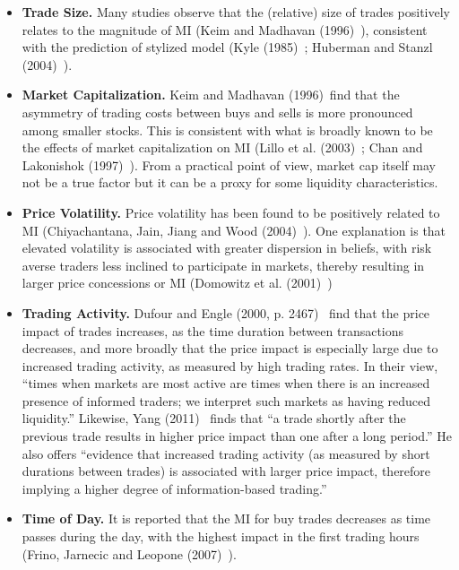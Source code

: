 \begin{itemize}
\item \textbf{Trade Size.} Many studies observe that the (relative) size of trades positively relates to the magnitude of MI (Keim and Madhavan (1996)~\cite{madhavan}), consistent with the prediction of stylized model (Kyle (1985)~\cite{kyle1985}; Huberman and Stanzl (2004)~\cite{huberstan}).

\item \textbf{Market Capitalization.} Keim and Madhavan (1996)~\cite{keim1996}find that the asymmetry of trading costs between buys and sells is more pronounced among smaller stocks. This is consistent with what is broadly known to be the effects of market capitalization on MI (Lillo et al. (2003)~\cite{farmermantegna}; Chan and Lakonishok (1997)~\cite{chan1997}). From a practical point of view, market cap itself may not be a true factor but it can be a proxy for some liquidity characteristics. 

\item \textbf{Price Volatility.} Price volatility has been found to be positively related to MI (Chiyachantana, Jain, Jiang and Wood (2004)~\cite{chiya2004}). One explanation is that elevated volatility is associated with greater dispersion in beliefs, with risk averse traders less inclined to participate in markets, thereby resulting in larger price concessions or MI (Domowitz et al. (2001)~\cite{domo2001})

\item \textbf{Trading Activity.} Dufour and Engle (2000, p. 2467)~\cite{dufour} find that the price impact of trades increases, as the time duration between transactions decreases, and more broadly that the price impact is especially large due to increased trading activity, as measured by high trading rates. In their view, ``times when markets are most active are times when there is an increased presence of informed traders; we interpret such markets as having reduced liquidity.'' Likewise, Yang (2011)~\cite[p.91]{yang2011} finds that ``a trade shortly after the previous trade results in higher price impact than one after a long period.'' He also offers ``evidence that increased trading activity (as measured by short durations between trades) is associated with larger price impact, therefore implying a higher degree of information-based trading.''

\item \textbf{Time of Day.} It is reported that the MI for buy trades decreases as time passes during the day, with the highest impact in the first trading hours (Frino, Jarnecic and Leopone (2007)~\cite{frino}).
\end{itemize}


